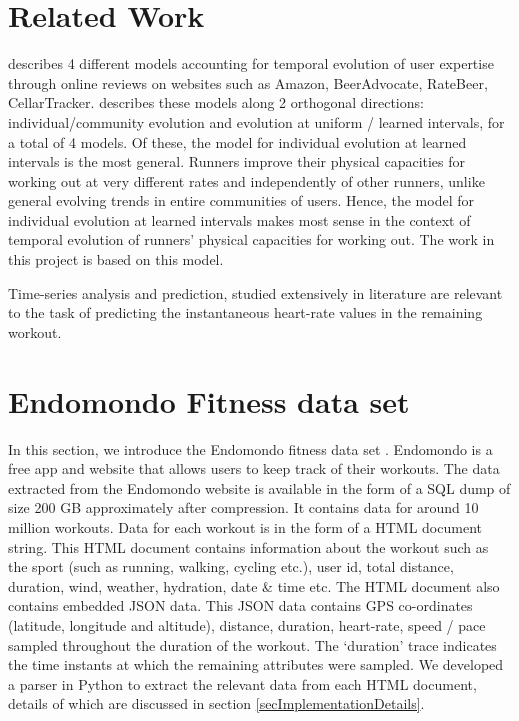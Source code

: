 \documentclass{acm_proc_article-sp}
\begin{document}
\section{Related Work}
\label{secRelatedWork}
\cite{www13} describes 4 different models accounting for temporal evolution of user expertise through online reviews on websites such as Amazon, BeerAdvocate, RateBeer, CellarTracker. \cite{www13} describes these models along 2 orthogonal directions: individual/community evolution and evolution at uniform / learned intervals, for a total of 4 models. Of these, the model for individual evolution at learned intervals is the most general. Runners improve their physical capacities for working out at very different rates and independently of other runners, unlike general evolving trends in entire communities of users. Hence, the model for individual evolution at learned intervals makes most sense in the context of temporal evolution of runners' physical capacities for working out. The work in this project is based on this model.

Time-series analysis and prediction, studied extensively in literature \cite{timeSeriesStudy, timeSeriesSurvey, autoRegressiveModelWiki} are relevant to the task of predicting the instantaneous heart-rate values in the remaining workout.

\section{Endomondo Fitness data set}
\label{secDataset}
In this section, we introduce the Endomondo fitness data set \cite{endomondo}. Endomondo \cite{endomondo} is a free app and website that allows users to keep track of their workouts. The data extracted from the Endomondo website \cite{endomondo} is available in the form of a SQL dump of size 200 GB approximately after compression. It contains data for around 10 million workouts. Data for each workout is in the form of a HTML document string. This HTML document contains information about the workout such as the sport (such as running, walking, cycling etc.), user id, total distance, duration, wind, weather, hydration, date \& time etc. The HTML document also contains embedded JSON data. This JSON data contains GPS co-ordinates (latitude, longitude and altitude), distance, duration, heart-rate, speed / pace sampled throughout the duration of the workout. The `duration' trace indicates the time instants at which the remaining attributes were sampled. We developed a parser in Python to extract the relevant data from each HTML document, details of which are discussed in section \ref{secImplementationDetails}.
\end{document}

